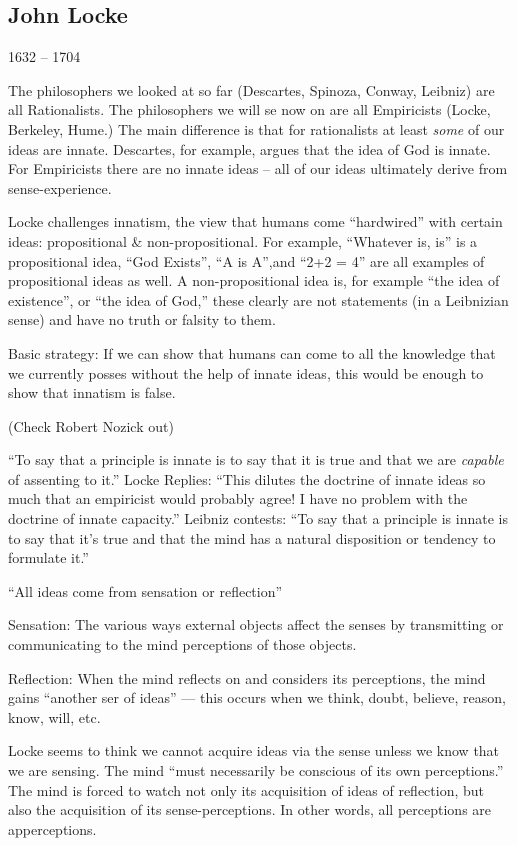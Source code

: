 \documentclass{article}
\begin{document}
    \begin{spacing}{1.2}
    \newpage
        \section*{John Locke}
        \begin{flushright}
            1632 -- 1704
        \end{flushright}
        The philosophers we looked at so far (Descartes, Spinoza, Conway, Leibniz) are all Rationalists. The philosophers we will se now on are all Empiricists (Locke, Berkeley, Hume.) The main difference is that for rationalists at least \emph{some} of our ideas are innate. Descartes, for example, argues that the idea of God is innate. For Empiricists there are no innate ideas -- all of our ideas ultimately derive from sense-experience.

        Locke challenges innatism, the view that humans come ``hardwired'' with certain ideas: propositional \& non-propositional. For example, ``Whatever is, is'' is a propositional idea, ``God Exists'', ``A is A'',and ``2+2 = 4'' are all examples of propositional ideas as well. A non-propositional idea is, for example ``the idea of existence'', or ``the idea of God,'' these clearly are not statements (in a Leibnizian sense) and have no truth or falsity to them.

        Basic strategy: If we can show that humans can come to all the knowledge that we currently posses without the help of innate ideas, this would be enough to show that innatism is false.

        (Check Robert Nozick out)

        ``To say that a principle is innate is to say that it is true and that we are \emph{capable} of assenting to it.''
        Locke Replies:
        ``This dilutes the doctrine of innate ideas so much that an empiricist would probably agree! I have no problem with the doctrine of innate capacity.''
        Leibniz contests: ``To say that a principle is innate is to say that it's true and that the mind has a natural disposition or tendency to formulate it.''

        ``All ideas come from sensation or reflection''

        Sensation: The various ways external objects affect the senses by transmitting or communicating to the mind perceptions of those objects.

        Reflection: When the mind reflects on and considers its perceptions, the mind gains ``another ser of ideas'' --- this occurs when we think, doubt, believe, reason, know, will, etc.

        Locke seems to think we cannot acquire ideas via the sense unless we know that we are sensing. The mind ``must necessarily be conscious  of its own perceptions.'' The mind is forced to watch not only its acquisition of ideas of reflection, but also the acquisition of its sense-perceptions. In other words, all perceptions are apperceptions.

    \end{spacing}
    
\end{document}
